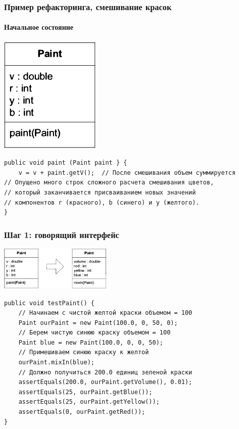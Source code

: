 \documentclass{../cscslides}
\begin{document}
    \begin{frame}[fragile]
        \frametitle{Пример рефакторинга, смешивание красок}
        \framesubtitle{Начальное состояние}
        \begin{center}
            \includegraphics[height=0.3\textheight]{originalPaint.png}
        \end{center}
        \begin{footnotesize}
            \begin{verbatim}
public void paint (Paint paint } {
    v = v + paint.getV();  // После смешивания объем суммируется
// Опущено много строк сложного расчета смешивания цветов,
// который заканчивается присваиванием новых значений
// компонентов r (красного), b (синего) и y (желтого).
}
            \end{verbatim}
        \end{footnotesize}
\end{frame}

    \begin{frame}[fragile]
        \frametitle{Шаг 1: говорящий интерфейс}
        \begin{center}
            \includegraphics[width=0.4\textwidth]{informativeInterfaceForPaint.png}
        \end{center}
        \begin{footnotesize}
            \begin{verbatim}
public void testPaint() {
    // Начинаем с чистой желтой краски объемом = 100
    Paint ourPaint = new Paint(100.0, 0, 50, 0);
    // Берем чистую синюю краску объемом = 100
    Paint bluе = new Paint(100.0, 0, 0, 50);
    // Примешиваем синюю краску к желтой
    ourPaint.mixIn(blue); 
    // Должно получиться 200.0 единиц зеленой краски
    assertEquals(200.0, ourPaint.getVolume(), 0.01);
    assertEquals(25, ourPaint.getBlue());
    assertEquals(25, ourPaint.getYellow());
    assertEquals(0, ourPaint.getRed());
}
            \end{verbatim}
        \end{footnotesize}
\end{frame}
\end{document}
